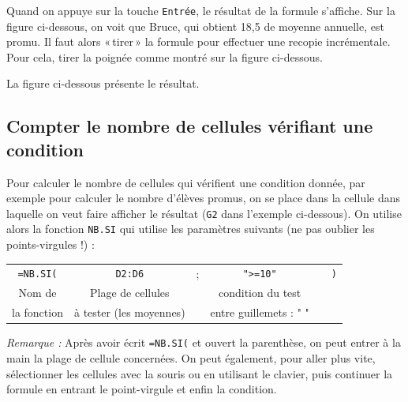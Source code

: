 
Quand on appuye sur la touche \texttt{Entrée}, le résultat de la formule s'affiche. Sur la figure ci-dessous, on voit que Bruce, qui obtient 18,5 de moyenne annuelle, est promu. Il faut alors «\,tirer\,» la formule pour effectuer une recopie incrémentale. Pour cela, tirer la poignée comme montré sur la figure ci-dessous.


La figure ci-dessous présente le résultat.


\subsection{Compter le nombre de cellules vérifiant une condition}\label{Calc3NBSI}

Pour calculer le nombre de cellules qui vérifient une condition donnée, par exemple pour calculer le nombre d'élèves promus, on se place dans la cellule dans laquelle on veut faire afficher le résultat (\texttt{G2} dans l'exemple ci-dessous). On utilise alors la fonction \texttt{NB.SI} qui utilise les paramètres suivants (ne pas oublier les points-virgules !) :


\begin{center}
\begin{tabular}{cccccc}
\texttt{=NB.SI(} & \texttt{D2:D6} & ; & \texttt{">=10"} &  &  \texttt{)} \\  
Nom de & Plage de cellules  & & condition du test &  & \\
la fonction & à tester (les moyennes) & &  entre guillemets : " " & & \\  
\end{tabular}
\end{center}



\emph{Remarque :} Après avoir écrit \texttt{=NB.SI(} et ouvert la parenthèse, on peut entrer à la main la plage de cellule concernées. On peut également, pour aller plus vite, sélectionner les cellules avec la souris ou en utilisant le clavier, puis continuer la formule en entrant le point-virgule et enfin la condition.



